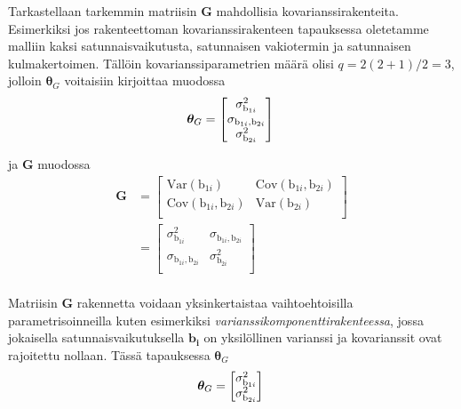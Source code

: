 \documentclass[finnish]{docopts}
\begin{document}

Tarkastellaan tarkemmin matriisin $\bm{G}$ mahdollisia kovarianssirakenteita. Esimerkiksi jos rakenteettoman kovarianssirakenteen tapauksessa oletetamme malliin kaksi satunnaisvaikutusta, satunnaisen vakiotermin ja satunnaisen kulmakertoimen. Tällöin kovarianssiparametrien määrä olisi $q=2(2+1)/2=3$, jolloin $\bm{\theta}_G$ voitaisiin kirjoittaa muodossa\\

$$
\bm{\theta}_G =
\begin{bmatrix}
\sigma^2_{\text{b}_{1i}}\\
\sigma_{\text{b}_{1i}, \text{b}_{2i}} \\
\sigma^2_{\text{b}_{2i}} \\
\end{bmatrix}\\
$$

ja $\bm{G}$ muodossa \\

$$
\begin{aligned}
\bm{G} &=
\begin{bmatrix}
\text{Var}(\text{b}_{1i}) & \text{Cov}(\text{b}_{1i}, \text{b}_{2i}) \\
\text{Cov}(\text{b}_{1i}, \text{b}_{2i}) & \text{Var}(\text{b}_{2i}) \\
\end{bmatrix} \\
&=
\begin{bmatrix}
\sigma^2_{\text{b}_{1i}} & \sigma_{\text{b}_{1i}, \text{b}_{2i}} \\
\sigma_{\text{b}_{1i}, \text{b}_{2i}} & \sigma^2_{\text{b}_{2i}} \\
\end{bmatrix} \\
\end{aligned}
$$

Matriisin $\bm{G}$ rakennetta voidaan yksinkertaistaa vaihtoehtoisilla parametrisoinneilla kuten esimerkiksi \textit{varianssikomponenttirakenteessa}, jossa jokaisella satunnaisvaikutuksella $\bm{b_i}$ on yksilöllinen varianssi ja kovarianssit ovat rajoitettu nollaan. Tässä tapauksessa $\bm{\theta}_G$ \\

$$
\bm{\theta}_G =
\begin{bmatrix}
\sigma^2_{\text{b}_{1i}}\\
\sigma^2_{\text{b}_{2i}} \\
\end{bmatrix}\\
$$
\end{document}
